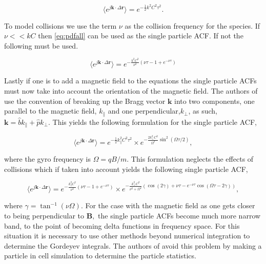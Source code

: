  \begin{equation}
\label{eq:pdfall}
\langle e^{j\mathbf{k}\cdot\Delta \mathbf{r}}\rangle= e^{-\frac{1}{2}k^2C^2 \tau^2}.
\end{equation}
 
 To model collisions we use the term $\nu$ as the collision frequency for the species. If $\nu<<kC$ then \ref{eq:pdfall} can be used as the single particle ACF. If not the following must be used.
 
 \begin{equation}
 \label{eq:colspacf}
 \langle e^{j\mathbf{k}\cdot\Delta \mathbf{r}}\rangle = e^{-\frac{k^2C^2}{\nu^2}\left( \nu \tau-1+e^{-\nu\tau}\right)}
 \end{equation}
 
Lastly if one is to add a magnetic field to the equations the single particle ACFs must now take into account the orientation of the magnetic field. The authors of \citet{kudeki:milla:1} use the convention of breaking up the Bragg vector $\mathbf{k}$ into two components, one parallel to the magnetic field, $k_{\parallel}$ and one perpendicular,$k_{\perp}$, as such, $\mathbf{k}= \hat{b}k_{\parallel}+\hat{p}k_{\perp}$. This yields the following formulation for the single particle ACF,

 \begin{equation}
\label{eq:pdfmag}
\langle e^{j\mathbf{k}\cdot\Delta \mathbf{r}}\rangle= e^{-\frac{1}{2}k_{\parallel}^2C^2 \tau^2}\times e^{-\frac{2k_{\perp}^2C^2}{\Omega^2} \sin^2(\Omega\tau/2)},
\end{equation}

\noindent where the gyro frequency is $\Omega = qB/m$. This formulation neglects the effects of collisions which if taken into account yields the following single particle ACF,

\begin{equation}
\label{eq:colspacf}
\langle e^{j\mathbf{k}\cdot\Delta \mathbf{r}}\rangle = e^{-\frac{k_\parallel^2C^2}{\nu^2}\left( \nu \tau-1+e^{-\nu\tau}\right)}\times e^{-\frac{k_\perp^2C^2}{\nu^2+\Omega^2}\left(\cos(2\gamma) + \nu \tau-e^{-\nu\tau}\cos(\Omega\tau-2\gamma)\right)},
\end{equation}
 
\noindent where $\gamma = \tan^{-1}(\nu\Omega)$. For the case with the magnetic field as one gets closer to being perpendicular to $\mathbf{B},$ the single particle ACFs become much more narrow band, to the point of becoming delta functions in frequency space. For this situation it is necessary to use other methods beyond numerical integration to determine the Gordeyev integrals. The authors of \citet{kudeki:milla:2} avoid this problem by making a particle in cell simulation to determine the particle statistics. 


